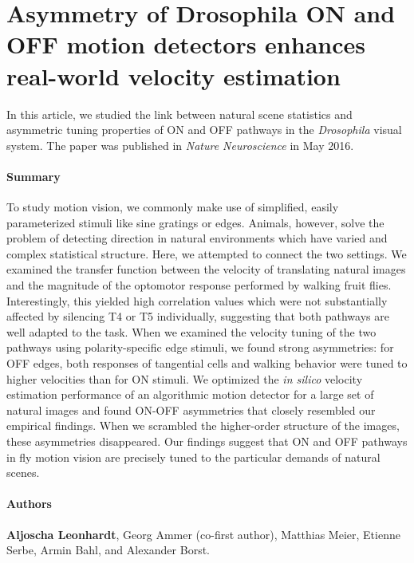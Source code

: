 \section{Asymmetry of Drosophila ON and OFF motion detectors enhances real-world velocity estimation}
\label{sct:manuscript_leonhardt}

In this article, we studied the link between natural scene statistics and asymmetric tuning properties of ON and OFF pathways in the \textit{Drosophila} visual system. The paper was published in \textit{Nature Neuroscience} in May 2016.

\paragraph{Summary}
To study motion vision, we commonly make use of simplified, easily parameterized stimuli like sine gratings or edges. Animals, however, solve the problem of detecting direction in natural environments which have varied and complex statistical structure. Here, we attempted to connect the two settings. We examined the transfer function between the velocity of translating natural images and the magnitude of the optomotor response performed by walking fruit flies. Interestingly, this yielded high correlation values which were not substantially affected by silencing T4 or T5 individually, suggesting that both pathways are well adapted to the task. When we examined the velocity tuning of the two pathways using polarity-specific edge stimuli, we found strong asymmetries: for OFF edges, both responses of tangential cells and walking behavior were tuned to higher velocities than for ON stimuli. We optimized the \textit{in silico} velocity estimation performance of an algorithmic motion detector for a large set of natural images and found ON-OFF asymmetries that closely resembled our empirical findings. When we scrambled the higher-order structure of the images, these asymmetries disappeared. Our findings suggest that ON and OFF pathways in fly motion vision are precisely tuned to the particular demands of natural scenes.

\paragraph{Authors} \textbf{Aljoscha Leonhardt}, Georg Ammer (co-first author), Matthias Meier, Etienne Serbe, Armin Bahl, and Alexander Borst.

